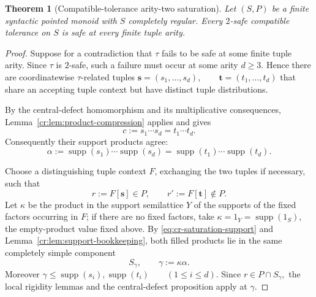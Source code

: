 \documentclass[10pt,a4paper]{amsart}
\newtheorem{theorem}{Theorem}
\begin{document}
\begin{theorem}[Compatible-tolerance arity-two saturation]
\label{cr:thm:tolerance-saturation}
Let $(S,P)$ be a finite syntactic pointed monoid with $S$ completely regular.
Every $2$-safe compatible tolerance on $S$ is safe at every finite tuple
arity.
\end{theorem}

\begin{proof}
Suppose for a contradiction that $\tau$ fails to be safe at some finite tuple arity.  Since $\tau$ is $2$-safe, such a failure must occur at some arity \(d\ge3\).  Hence there are coordinatewise $\tau$-related tuples
\(\mathbf s=(s_1,\ldots,s_d), \qquad \mathbf t=(t_1,\ldots,t_d)\)
that share an accepting tuple context but have distinct tuple distributions.

By the central-defect homomorphism and its multiplicative consequences,
Lemma~\ref{cr:lem:product-compression} applies and gives
\begin{equation}
c
:=
s_1\cdots s_d
=
t_1\cdots t_d.
\label{eq:cr-saturation-product}
\end{equation}
Consequently their support products agree:
\begin{equation}
\alpha
:=
\operatorname{supp}(s_1)\cdots\operatorname{supp}(s_d)
=
\operatorname{supp}(t_1)\cdots\operatorname{supp}(t_d).
\label{eq:cr-saturation-support}
\end{equation}

Choose a distinguishing tuple context $F$, exchanging the two tuples if
necessary, such that
\begin{equation}
r:=F[\mathbf s]\in P,
\qquad
r':=F[\mathbf t]\notin P.
\label{eq:cr-distinguishing-context}
\end{equation}
Let $\kappa$ be the product in the support semilattice $Y$ of the supports of
the fixed factors occurring in $F$; if there are no fixed factors, take
$\kappa=1_Y=\operatorname{supp}(1_S)$, the empty-product value fixed above. By \eqref{eq:cr-saturation-support} and
Lemma~\ref{cr:lem:support-bookkeeping}, both filled products
lie in the same completely simple component
\begin{equation}
S_\gamma,
\qquad
\gamma:=\kappa\alpha.
\label{eq:cr-gamma-component}
\end{equation}
Moreover
\(\gamma \le \operatorname{supp}(s_i), \operatorname{supp}(t_i) \qquad(1\le i\le d).\)
Since \(r\in P\cap S_\gamma,\) the local rigidity lemmas and the central-defect proposition apply at $\gamma$.


\end{proof}
\end{document}
